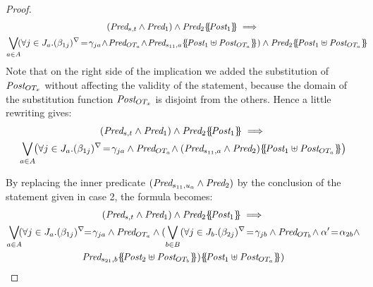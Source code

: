 \documentclass{lmcs}
\begin{document}
\begin{proof}
\begin{multline*}
(\Pred_{s,t} \land \Pred_1)\wedge\Pred_2\subst{\Post_1}\implies \\
 \bigvee_{a\in A}
  \!\! ( \forall j\in J_a. \vis{\beta_{1j}}\!=\!\gamma_{ja}\!  \land\! \Pred_{OT_a}\! \land\!
     \Pred_{s_{11},a}\subst{\Post_1\uplus\Post_{OT_a}}) \wedge \Pred_2\subst{\Post_1\uplus\Post_{OT_a}}  \hspace{-2ex}
\end{multline*}
Note that  on the right side of the implication we added  the substitution  of $\Post_{OT_x}$ without affecting the validity of the statement, because  the domain  of the substitution function $\Post_{OT_x}$ is disjoint from the others. Hence a little rewriting gives:
\begin{multline*}
(\Pred_{s,t} \land \Pred_1)\wedge\Pred_2\subst{\Post_1}\implies\\
\bigvee_{a\in A}
\!\!   \left(\forall j\in J_a. \vis{\beta_{1j}}\!=\!\gamma_{ja}\land \Pred_{OT_a}
     \!\land(\Pred_{s_{11},a}\wedge\Pred_2)\subst{\Post_1\uplus\Post_{OT_a}} \right)
\end{multline*}

By replacing the inner predicate $(\Pred_{s_{11},u_a}\wedge\Pred_2)$ by the conclusion of the  statement given in case 2,  the formula becomes: 
\begin{multline*}(\Pred_{s,t} \land \Pred_1)\wedge\Pred_2\subst{\Post_1}\implies\\
{\bigvee_{a\in A}}
   \!\!(\forall j\in J_a. \vis{\beta_{1j}}\!\!=\!\gamma_{ja}  \land \Pred_{OT_a}
      \land ({\bigvee_{b\in B}}(
    \forall j\in J_{b}. \vis{\beta_{2j}}\!=\!\gamma_{jb}  \land \Pred_{OT_{b}}\!\land 
    \alpha'\!=\!\alpha_{2 b} \land\\ \Pred_{s_{21},b}\subst{\Post_2\uplus\Post_{OT_{b}}})\subst{\Post_1\uplus\Post_{OT_a}})
\end{multline*}


\end{proof}
\end{document}

